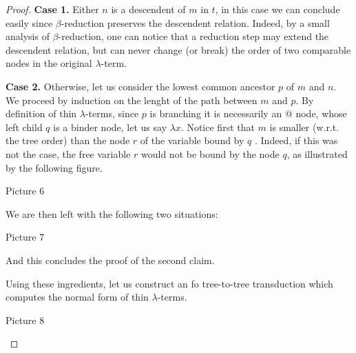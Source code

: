 \begin{proof}
\textbf{Case 1.} Either $n$ is a descendent of $m$ in $t$, in this case we can conclude easily since $\beta$-reduction preserves the descendent relation. Indeed, by a small analysis of $\beta$-reduction, one can notice that a reduction step may extend the descendent relation, but can never change (or break) the order of two comparable nodes in the original $\lambda$-term.    

\textbf{Case 2.} Otherwise, let us consider the lowest common ancestor $p$ of $m$ and $n$. We proceed by induction on the lenght of the path between $m$ and $p$. By definition of thin $\lambda$-terms, since $p$ is branching it is necessarily an $\text{@}$ node, whose left child $q$ is a binder node, let us say $\lambda x$. 
Notice first that $m$ is smaller (w.r.t. the tree order) than the node $r$ of the variable bound by $q$ . Indeed, if this was not the case, the free variable $r$ would not be bound by the node $q$, as illustrated by the following figure.
\begin{center}
Picture 6
\end{center}
We are then left with the following two situations:
\begin{center}
Picture 7
\end{center}    
And this concludes the proof of the second claim.

Using these ingredients, let us construct an fo tree-to-tree transduction which computes the normal form of thin $\lambda$-terms.
\begin{center}
Picture 8
\end{center}



\end{proof}
